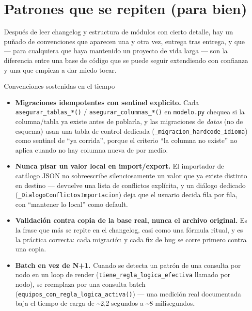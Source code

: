 \documentclass[11pt,twocolumn]{article}
\begin{document}
\section{Patrones que se repiten (para bien)}

Después de leer changelog y estructura de módulos con cierto detalle, hay un puñado de convenciones que aparecen una y otra vez, entrega tras entrega, y que --- para cualquiera que haya mantenido un proyecto de vida larga --- son la diferencia entre una base de código que se puede seguir extendiendo con confianza y una que empieza a dar miedo tocar.

\begin{specbox}{Convenciones sostenidas en el tiempo}
\begin{itemize}[leftmargin=1.1em,itemsep=2pt,topsep=2pt]
\item \textbf{Migraciones idempotentes con sentinel explícito.} Cada \texttt{asegurar\_tablas\_*()} / \texttt{asegurar\_columnas\_*()} en \texttt{modelo.py} chequea si la columna/tabla ya existe antes de poblarla, y las migraciones de \emph{datos} (no de esquema) usan una tabla de control dedicada (\texttt{\_migracion\_hardcode\_idioma}) como sentinel de ``ya corrida'', porque el criterio ``la columna no existe'' no aplica cuando no hay columna nueva de por medio.
\item \textbf{Nunca pisar un valor local en import/export.} El importador de catálogo JSON no sobreescribe silenciosamente un valor que ya existe distinto en destino --- devuelve una lista de conflictos explícita, y un diálogo dedicado (\texttt{\_DialogoConflictosImportacion}) deja que el usuario decida fila por fila, con ``mantener lo local'' como default.
\item \textbf{Validación contra copia de la base real, nunca el archivo original.} Es la frase que más se repite en el changelog, casi como una fórmula ritual, y es la práctica correcta: cada migración y cada fix de bug se corre primero contra una copia.
\item \textbf{Batch en vez de N+1.} Cuando se detecta un patrón de una consulta por nodo en un loop de render (\texttt{tiene\_regla\_logica\_efectiva} llamado por nodo), se reemplaza por una consulta batch (\texttt{equipos\_con\_regla\_logica\_activa()}) --- una medición real documentada baja el tiempo de carga de \textasciitilde2{,}2 segundos a \textasciitilde8 milisegundos.
\end{itemize}
\end{specbox}
\end{document}

